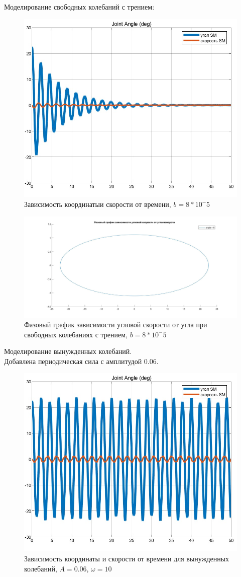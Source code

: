 \documentclass{article}
\begin{document}
	Моделирование свободных колебаний с трением:
	\begin{figure}[H]
		\centering
		\includegraphics[width=0.7\linewidth]{k2}
		\caption{Зависимость координатыи скорости от времени, $b = 8*10^-5$}
		\label{fig:k2}
	\end{figure}
	\begin{figure}[H]
		\centering
		\includegraphics[width=0.7\linewidth]{phase2}
		\caption{Фазовый график зависимости угловой скорости от угла при свободных колебаниях с трением, $b = 8*10^-5$}
		\label{fig:phase2}
	\end{figure}
	Моделирование вынужденных колебаний.\\
	Добавлена периодическая сила с амплитудой 0.06.
	\begin{figure}[H]
		\centering
		\includegraphics[width=0.7\linewidth]{k3}
		\caption{Зависимость координаты и скорости от времени для вынужденных колебаний, $A =0.06$, $\omega = 10$}
		\label{fig:k3}
	\end{figure}
\end{document}
